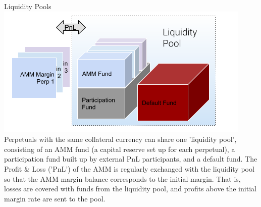 \documentclass[10pt,a4paper]{article}
\begin{document}
\begin{multicols}{3}
\begin{textbox}{Liquidity Pools}
\includegraphics[width=\textwidth]{CapitalPots.png}
Perpetuals with the same 
    collateral currency can share one 'liquidity pool', consisting of
    an AMM fund (a capital reserve set up for each perpetual),
    a participation fund built up by external PnL participants, and a default fund.
    The Profit \& Loss ('PnL') of the AMM is regularly exchanged 
    with the liquidity pool so that the AMM margin balance 
    corresponds to the initial margin. That is,
    losses are covered with funds  
    from the liquidity pool, and profits above the initial margin rate
    are sent to the pool.
\end{textbox}


\end{multicols}
\end{document}
